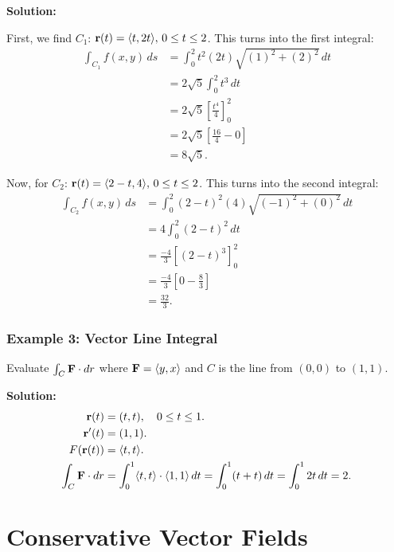 \textbf{Solution:}

First, we find \(C_{1}\): \(\mathbf{r}(t) = \langle t,2t\rangle, \, 0 \leq t \leq 2\). This turns into the first integral:
\begin{align*}
    \int_{C_{1}} f(x,y) \, ds &= \int_{0}^{2} t^{2}(2t) \sqrt{(1)^{2} + (2)^{2}} \, dt \\
    &= 2\sqrt{5} \int_{0}^{2} t^{3}  \, dt \\
    &= 2\sqrt{5} \left[ \frac{t^{4}}{4} \right]_{0}^{2} \\
    &= 2\sqrt{5} \left[ \frac{16}{4} - 0 \right] \\
    &= 8\sqrt{5}.
\end{align*}

Now, for \(C_{2}\): \(\mathbf{r}(t) = \langle 2 - t, 4\rangle, \, 0 \leq t \leq 2\). This turns into the second integral:
\begin{align*}
    \int_{C_{2}} f(x,y) \, ds &= \int_{0}^{2} (2 - t)^{2}(4) \sqrt{(-1)^{2} + (0)^{2}} \, dt \\
    &= 4\int_{0}^{2} (2 - t)^{2} \, dt \\
    &= \frac{-4}{3}\left[ (2 - t)^{3} \right]_{0}^{2} \\
    &= \frac{-4}{3}\left[ 0 - \frac{8}{3} \right] \\
    &= \frac{32}{3}.
\end{align*}

\subsubsection{Example 3: Vector Line Integral}
Evaluate \( \int_C \mathbf{F} \cdot dr \) where \( \mathbf{F} = \langle y, x \rangle \) and \( C \) is the line from \( (0,0) \) to \( (1,1) \).

\textbf{Solution:}
\begin{align*}
    \mathbf{r}(t) &= (t, t), \quad 0 \leq t \leq 1. \\
    \mathbf{r}'(t) &= (1,1). \\
    F(\mathbf{r}(t)) &= \langle t, t \rangle. \\
    \int_C \mathbf{F} \cdot dr &= \int_0^1 \langle t, t \rangle \cdot \langle 1, 1 \rangle \, dt = \int_0^1 (t + t) \, dt = \int_0^1 2t \, dt = 2.
\end{align*}

\newpage

\section{Conservative Vector Fields}

